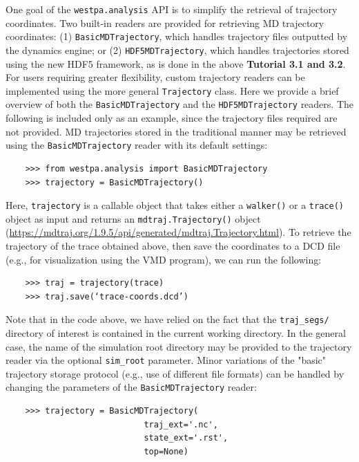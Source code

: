 One goal of the \verb|westpa.analysis| API is to simplify the retrieval of trajectory coordinates.
Two built-in readers are provided for retrieving MD trajectory coordinates: (1) \verb|BasicMDTrajectory|, which handles trajectory files outputted by the dynamics engine; or (2) \verb|HDF5MDTrajectory|, which handles trajectories stored using the new HDF5 framework, as is done in the above \textbf{Tutorial 3.1 and 3.2}.
For users requiring greater flexibility, custom trajectory readers can be implemented using the more general \verb|Trajectory| class.
Here we provide a brief overview of both the \verb|BasicMDTrajectory| and the \verb|HDF5MDTrajectory| readers.
The following is included only as an example, since the trajectory files required are not provided.
MD trajectories stored in the traditional manner may be retrieved using the \verb|BasicMDTrajectory| reader with its default settings:

\begin{verbatim}
    >>> from westpa.analysis import BasicMDTrajectory
    >>> trajectory = BasicMDTrajectory()
\end{verbatim}

Here, \verb|trajectory| is a callable object that takes either a \verb|walker()| or a \verb|trace()| object as input and returns an \verb|mdtraj.Trajectory()| object ({\url{https://mdtraj.org/1.9.5/api/generated/mdtraj.Trajectory.html}}).
To retrieve the trajectory of the trace obtained above, then save the coordinates to a DCD file (e.g., for visualization using the VMD program), we can run the following:

\begin{verbatim}
    >>> traj = trajectory(trace)
    >>> traj.save(‘trace-coords.dcd’)
\end{verbatim}

Note that in the code above, we have relied on the fact that the \verb|traj_segs/| directory of interest is contained in the current working directory.
In the general case, the name of the simulation root directory may be provided to the trajectory reader via the optional \verb|sim_root| parameter.
Minor variations of the "basic" trajectory storage protocol (e.g., use of different file formats) can be handled by changing the parameters of the \verb|BasicMDTrajectory| reader: 

\begin{verbatim}
    >>> trajectory = BasicMDTrajectory(
                            traj_ext='.nc', 
                            state_ext='.rst', 
                            top=None)
\end{verbatim}

